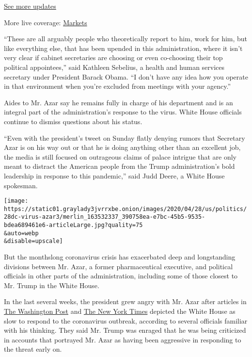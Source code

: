 \href{https://www.nytimes3xbfgragh.onion/2020/08/01/world/coronavirus-covid-19.html?action=click\&pgtype=Article\&state=default\&region=MAIN_CONTENT_1\&context=storylines_live_updates}{See
more updates}

More live coverage:
\href{https://www.nytimes3xbfgragh.onion/live/2020/07/31/business/stock-market-today-coronavirus?action=click\&pgtype=Article\&state=default\&region=MAIN_CONTENT_1\&context=storylines_live_updates}{Markets}

``These are all arguably people who theoretically report to him, work
for him, but like everything else, that has been upended in this
administration, where it isn't very clear if cabinet secretaries are
choosing or even co-choosing their top political appointees,'' said
Kathleen Sebelius, a health and human services secretary under President
Barack Obama. ``I don't have any idea how you operate in that
environment when you're excluded from meetings with your agency.''

Aides to Mr. Azar say he remains fully in charge of his department and
is an integral part of the administration's response to the virus. White
House officials continue to dismiss questions about his status.

``Even with the president's tweet on Sunday flatly denying rumors that
Secretary Azar is on his way out or that he is doing anything other than
an excellent job, the media is still focused on outrageous claims of
palace intrigue that are only meant to distract the American people from
the Trump administration's bold leadership in response to this
pandemic,'' said Judd Deere, a White House spokesman.

\texttt{[image: https://static01.graylady3jvrrxbe.onion/images/2020/04/28/us/politics/28dc-virus-azar3/merlin\_163532337\_390758ea-e7bc-45b5-9535-bdea689461e6-articleLarge.jpg?quality=75\\\&auto=webp\\\&disable=upscale]}

But the monthslong coronavirus crisis has exacerbated deep and
longstanding divisions between Mr. Azar, a former pharmaceutical
executive, and political officials in other parts of the administration,
including some of those closest to Mr. Trump in the White House.

In the last several weeks, the president grew angry with Mr. Azar after
articles in
\href{https://www.washingtonpost.com/politics/trump-coronavirus-response-squandered-time/2020/03/07/5c47d3d0-5fcb-11ea-9055-5fa12981bbbf_story.html}{The
Washington Post} and
\href{https://www.nytimes3xbfgragh.onion/2020/03/28/us/testing-coronavirus-pandemic.html}{The
New York Times} depicted the White House as slow to respond to the
coronavirus outbreak, according to several officials familiar with his
thinking. They said Mr. Trump was enraged that he was being criticized
in accounts that portrayed Mr. Azar as having been aggressive in
responding to the threat early on.

